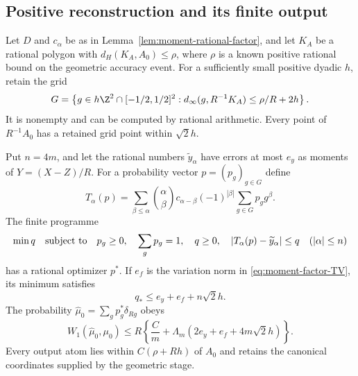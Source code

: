 \subsection{Positive reconstruction and its finite output}
\begin{lemma}
\label{lem:moment-positive-programme}
Let $D$ and $c_\alpha$ be as in
Lemma~\ref{lem:moment-rational-factor}, and let $K_A$ be a rational
polygon with $d_H(K_A,A_0)\le\rho$, where $\rho$ is a known
positive rational bound on the geometric accuracy event.  For a
sufficiently small positive dyadic $h$, retain the grid
\begin{equation}\label{eq:moment-padded-grid}
 G=\left\{g\in h\Z^2\cap[-1/2,1/2]^2:
   d_\infty(g,R^{-1}K_A)\le\rho/R+2h\right\}.
\end{equation}
It is nonempty and can be computed by rational arithmetic.  Every
point of $R^{-1}A_0$ has a retained grid point within $\sqrt2h$.

Put $n=4m$, and let the rational numbers $\widetilde y_\alpha$
have errors at most $e_y$ as moments of $Y=(X-Z)/R$.  For a
probability vector $p=(p_g)_{g\in G}$ define
\begin{equation}\label{eq:moment-positive-convolution}
 T_\alpha(p)=\sum_{\beta\le\alpha}\binom\alpha\beta
     c_{\alpha-\beta}(-1)^{|\beta|}
                              \sum_{g\in G}p_g g^\beta.
\end{equation}
The finite programme
\begin{equation}\label{eq:moment-positive-LP}
 \min q\quad\hbox{subject to}\quad
 p_g\ge0,\quad\sum_gp_g=1,\quad q\ge0,\quad
 |T_\alpha(p)-\widetilde y_\alpha|\le q
                                      \quad(|\alpha|\le n)
\end{equation}
has a rational optimizer $p^*$.  If $e_f$ is the variation norm in
\eqref{eq:moment-factor-TV}, its minimum satisfies
\begin{equation}\label{eq:moment-feasible-residual}
 q_*\le e_y+e_f+n\sqrt2h.
\end{equation}
The probability $\widehat\mu_0=\sum_gp_g^*\delta_{Rg}$ obeys
\begin{equation}\label{eq:moment-positive-output-bound}
 W_1(\widehat\mu_0,\mu_0)
 \le R\left\{\frac{C}{m}
            +\Lambda_m(2e_y+e_f+4m\sqrt2h)\right\}.
\end{equation}
Every output atom lies within $C(\rho+Rh)$ of $A_0$ and retains
the canonical coordinates supplied by the geometric stage.
\end{lemma}
